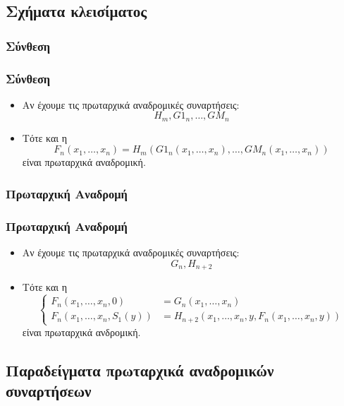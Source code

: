 \documentclass{beamer}
\begin{document}
\subsection{Σχήματα κλεισίματος}

\subsubsection{Σύνθεση}

\begin{frame}
        \frametitle{Σύνθεση}
        \begin{itemize}
                \item Αν έχουμε τις πρωταρχικά αναδρομικές συναρτήσεις: \[H_m, G1_n, \ldots, GM_n\]
                \pause
                \item Τότε και η \[F_n(x_1,\ldots,x_n) = H_m(G1_n(x_1,\ldots,x_n),\ldots,GM_n(x_1,\ldots,x_n))\]
                είναι πρωταρχικά αναδρομική.
        \end{itemize}
\end{frame}

\subsubsection{Πρωταρχική Αναδρομή}

\begin{frame}
        \frametitle{Πρωταρχική Αναδρομή}
        \begin{itemize}
                \item Αν έχουμε τις πρωταρχικά αναδρομικές συναρτήσεις: \[G_n, H_{n+2}\]
                \pause
                \item Τότε και η 
                \[
                        \left\{
                                \begin{array}{ll}
                                        F_n(x_1,\ldots,x_n, 0) &= G_n(x_1,\ldots,x_n) \\
                                        F_n(x_1,\ldots,x_n, S_1(y)) &= H_{n+2}(x_1,\ldots,x_n, y , F_n(x_1,\ldots,x_n, y))
                                \end{array}
                        \right.
                \]
                είναι πρωταρχικά ανδρομική.
        \end{itemize}
\end{frame}

\subsection{Παραδείγματα πρωταρχικά αναδρομικών συναρτήσεων}
\end{document}
